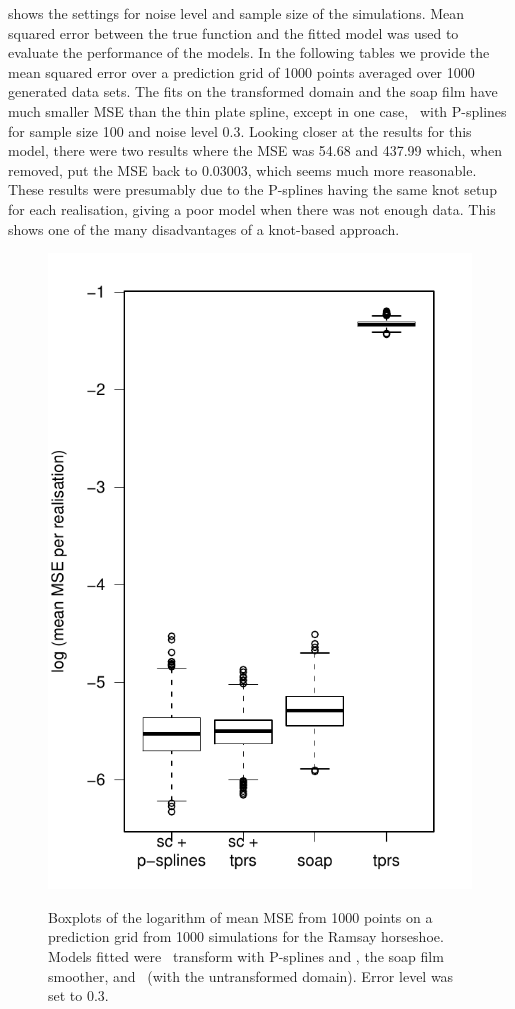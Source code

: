  shows the settings for noise level and sample size of the simulations. Mean squared error between the true function and the fitted model was used to evaluate the performance of the models. In the following tables we provide the mean squared error over a prediction grid of 1000 points averaged over 1000 generated data sets. The fits on the transformed domain and the soap film have much smaller MSE than the thin plate spline, except in one case, \sch\ with P-splines for sample size 100 and noise level 0.3. Looking closer at the results for this model, there were two results where the MSE was 54.68 and 437.99 which, when removed, put the MSE back to 0.03003, which seems much more reasonable. These results were presumably due to the P-splines having the same knot setup for each realisation, giving a poor model when there was not enough data. This shows one of the many disadvantages of a knot-based approach.

\begin{figure}
\centering
\includegraphics{sc/figs/sc-mses-boxplot.pdf} \\
\caption{Boxplots of the logarithm of mean MSE from 1000 points on a prediction grid from 1000 simulations for the Ramsay horseshoe. Models fitted were \sch\ transform with P-splines and \tprs, the soap film smoother, and \tprs\ (with the untransformed domain). Error level was set to 0.3.}
\label{scram1000boxplots}
\end{figure}

